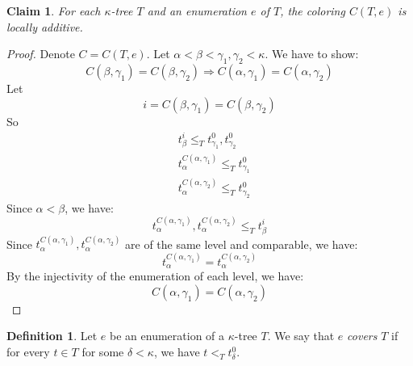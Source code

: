 \documentclass[11pt]{amsart}
\theoremstyle{plain}
\newtheorem{claim}[theorem]{Claim}
\theoremstyle{definition} %
\newtheorem{definition}[theorem]{Definition}
\theoremstyle{remark}
\begin{document}
\begin{claim}\label{claim C(T,e) is locally additive}
For each $\kappa$-tree $T$ and an enumeration $e$ of $T$, the coloring $C(T,e)$ is locally additive.
\end{claim}
\begin{proof}
Denote $C=C(T,e)$. Let $\alpha<\beta<\gamma_1,\gamma_2<\kappa$. We have to show:
\[
C(\beta,\gamma_1)=C(\beta,\gamma_2) \Rightarrow C(\alpha,\gamma_1)=C(\alpha,\gamma_2)
\]
Let
\[
i=C(\beta,\gamma_1)=C(\beta,\gamma_2)
\]
So
\begin{align*}
&t^i_\beta \leq_T t^0_{\gamma_1},t^0_{\gamma_2}\\
&t^{C(\alpha,\gamma_1)}_\alpha \leq_T t^0_{\gamma_1}\\
&t^{C(\alpha,\gamma_2)}_\alpha \leq_T t^0_{\gamma_2}
\end{align*}
Since $\alpha<\beta$, we have:
\[
t^{C(\alpha,\gamma_1)}_\alpha,t^{C(\alpha,\gamma_2)}_\alpha \leq_T t^i_\beta
\]
Since $t^{C(\alpha,\gamma_1)}_\alpha,t^{C(\alpha,\gamma_2)}_\alpha$ are of the same level and comparable, we have:
\[
t^{C(\alpha,\gamma_1)}_\alpha=t^{C(\alpha,\gamma_2)}_\alpha
\]
By the injectivity of the enumeration of each level, we have:
\[
C(\alpha,\gamma_1)=C(\alpha,\gamma_2)
\]

\end{proof}




\begin{definition}
Let $e$ be an enumeration of a $\kappa$-tree $T$. We say that $e$ \emph{covers} $T$ if for every $t \in T$ for some $\delta<\kappa$, we have $t <_T t_\delta^0$.%
\end{definition}
\end{document}
